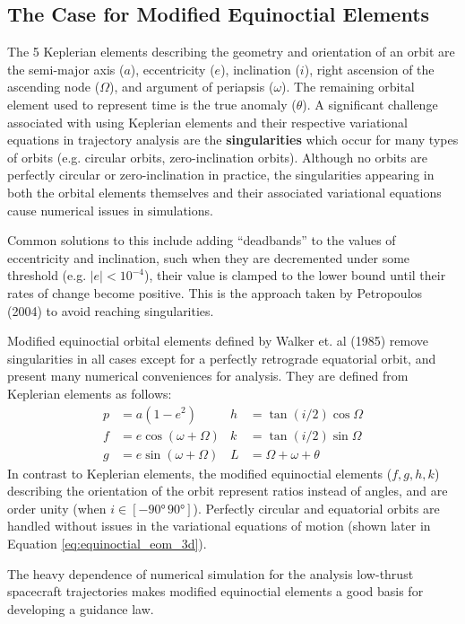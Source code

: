 \subsection{The Case for Modified Equinoctial Elements}
The 5 Keplerian elements describing the geometry and orientation of an orbit are the semi-major axis (\(a\)), eccentricity (\(e\)), inclination (\(i\)), right ascension of the ascending node (\(\Omega\)), and argument of periapsis (\(\omega\)). The remaining orbital element used to represent time is the true anomaly (\(\theta\)). A significant challenge associated with using Keplerian elements and their respective variational equations in trajectory analysis are the \textbf{singularities} which occur for many types of orbits (e.g. circular orbits, zero-inclination orbits). Although no orbits are perfectly circular or zero-inclination in practice, the singularities appearing in both the orbital elements themselves and their associated variational equations cause numerical issues in simulations.

Common solutions to this include adding ``deadbands'' to the values of eccentricity and inclination, such when they are decremented under some threshold (e.g. \(|e| < 10^{-4}\)), their value is clamped to the lower bound until their rates of change become positive. This is the approach taken by Petropoulos (2004) \cite{petropoulos2004low} to avoid reaching singularities.

Modified equinoctial orbital elements defined by Walker et. al (1985) \cite{walker1985set} remove singularities in all cases except for a perfectly retrograde equatorial orbit, and present many numerical conveniences for analysis. They are defined from Keplerian elements as follows:
\begin{align*}
  p & = a \left(1-e^2\right)    & h & = \tan(i/2) \cos \Omega    \\
  f & = e \cos(\omega + \Omega) & k & = \tan(i/2) \sin \Omega    \\
  g & = e \sin(\omega + \Omega) & L & = \Omega + \omega + \theta
\end{align*}
In contrast to Keplerian elements, the modified equinoctial elements (\(f, g, h, k\)) describing the orientation of the orbit represent ratios instead of angles, and are order unity (when \(i \in [-\ang{90}\, \ang{90}]\)). Perfectly circular and equatorial orbits are handled without issues in the variational equations of motion (shown later in Equation \ref{eq:equinoctial_eom_3d}).

The heavy dependence of numerical simulation for the analysis low-thrust spacecraft trajectories makes modified equinoctial elements a good basis for developing a guidance law.

